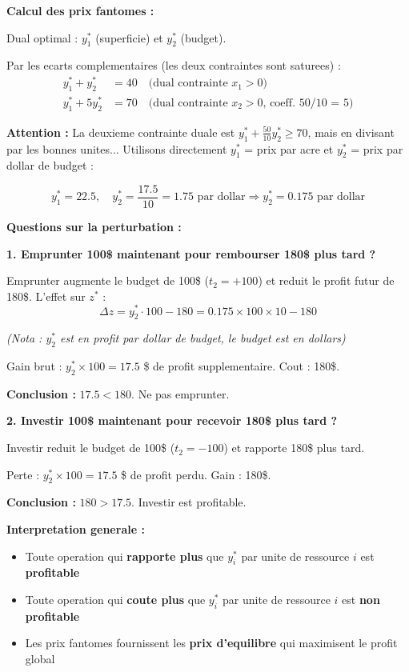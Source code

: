 \documentclass[12pt,a4paper]{article}
\begin{document}
\newpage
\begin{exemple}
\textbf{Calcul des prix fantomes :}

Dual optimal : $y_1^*$ (superficie) et $y_2^*$ (budget).

Par les ecarts complementaires (les deux contraintes sont saturees) :
\begin{align*}
y_1^* + y_2^* &= 40 \quad \text{(dual contrainte } x_1 > 0\text{)}\\
y_1^* + 5y_2^* &= 70 \quad \text{(dual contrainte } x_2 > 0\text{, coeff. 50/10 = 5)}
\end{align*}

\textbf{Attention :} La deuxieme contrainte duale est $y_1^* + \frac{50}{10}y_2^* \geq 70$, mais en divisant par les bonnes unites... Utilisons directement $y_1^*$ = prix par acre et $y_2^*$ = prix par dollar de budget :

$$y_1^* = 22.5, \quad y_2^* = \frac{17.5}{10} = 1.75 \text{ par dollar} \Rightarrow y_2^* = 0.175 \text{ par dollar}$$

\textbf{Questions sur la perturbation :}

\textbf{1. Emprunter 100\$ maintenant pour rembourser 180\$ plus tard ?}

Emprunter augmente le budget de 100\$ ($t_2 = +100$) et reduit le profit futur de 180\$. L'effet sur $z^*$ :
$$\Delta z = y_2^* \cdot 100 - 180 = 0.175 \times 100 \times 10 - 180$$

\textit{(Nota : $y_2^*$ est en profit par dollar de budget, le budget est en dollars)}

Gain brut : $y_2^* \times 100 = 17.5$ \$ de profit supplementaire. Cout : 180\$. 

\textcolor{importantrouge}{\textbf{Conclusion :}} $17.5 < 180$. Ne pas emprunter.

\textbf{2. Investir 100\$ maintenant pour recevoir 180\$ plus tard ?}

Investir reduit le budget de 100\$ ($t_2 = -100$) et rapporte 180\$ plus tard.

Perte : $y_2^* \times 100 = 17.5$ \$ de profit perdu. Gain : 180\$.

\textcolor{defvert}{\textbf{Conclusion :}} $180 > 17.5$. Investir est profitable.
\end{exemple}

\begin{astuce}
\textbf{Interpretation generale :}

\begin{itemize}
    \item Toute operation qui \textcolor{defvert}{\textbf{rapporte plus}} que $y_i^*$ par unite de ressource $i$ est \textbf{profitable}
    \item Toute operation qui \textcolor{importantrouge}{\textbf{coute plus}} que $y_i^*$ par unite de ressource $i$ est \textbf{non profitable}
    \item Les prix fantomes fournissent les \textcolor{algoviolet}{\textbf{prix d'equilibre}} qui maximisent le profit global
\end{itemize}
\end{astuce}
\end{document}
